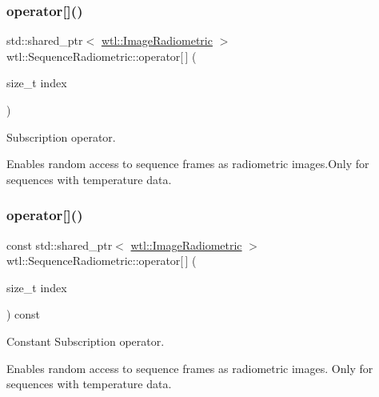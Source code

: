 \subsubsection{\texorpdfstring{operator[]()}{operator[]()}\hspace{0.1cm}{\footnotesize\ttfamily [1/2]}}
{\footnotesize\ttfamily std\+::shared\+\_\+ptr$<$ \hyperlink{classwtl_1_1_image_radiometric}{wtl\+::\+Image\+Radiometric} $>$ wtl\+::\+Sequence\+Radiometric\+::operator\mbox{[}$\,$\mbox{]} (\begin{DoxyParamCaption}\item[{size\+\_\+t}]{index }\end{DoxyParamCaption})}



Subscription operator. 

Enables random access to sequence frames as radiometric images.\+Only for sequences with temperature data. \mbox{\label{classwtl_1_1_sequence_radiometric_afb8a7fd35e6c4b10406953a12c4564fe}} 
\subsubsection{\texorpdfstring{operator[]()}{operator[]()}\hspace{0.1cm}{\footnotesize\ttfamily [2/2]}}
{\footnotesize\ttfamily const std\+::shared\+\_\+ptr$<$ \hyperlink{classwtl_1_1_image_radiometric}{wtl\+::\+Image\+Radiometric} $>$ wtl\+::\+Sequence\+Radiometric\+::operator\mbox{[}$\,$\mbox{]} (\begin{DoxyParamCaption}\item[{size\+\_\+t}]{index }\end{DoxyParamCaption}) const}



Constant Subscription operator. 

Enables random access to sequence frames as radiometric images. Only for sequences with temperature data. \mbox{\label{classwtl_1_1_sequence_radiometric_a3b465540b5cbc1a7f0dfd1f6d91aa7d1}} 
